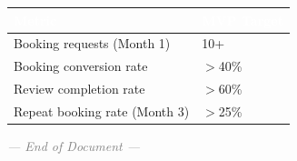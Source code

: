 \documentclass[11pt,a4paper]{article}
\begin{document}
\vspace{0.5em}
\begin{tabularx}{\textwidth}{@{} L{6cm} X @{}}
  \toprule
  \textcolor{white}{\textbf{Metric}} &
  \textcolor{white}{\textbf{MVP Target}} \\
  \midrule
  Booking requests (Month 1)        & 10+ \\
  Booking conversion rate           & $>$40\% \\
  Review completion rate            & $>$60\% \\
  Repeat booking rate (Month 3)     & $>$25\% \\
  \bottomrule
\end{tabularx}
\vspace{1em}

\vfill
\begin{center}
  \textcolor{gray}{\small\textit{--- End of Document ---}}
\end{center}
\end{document}
